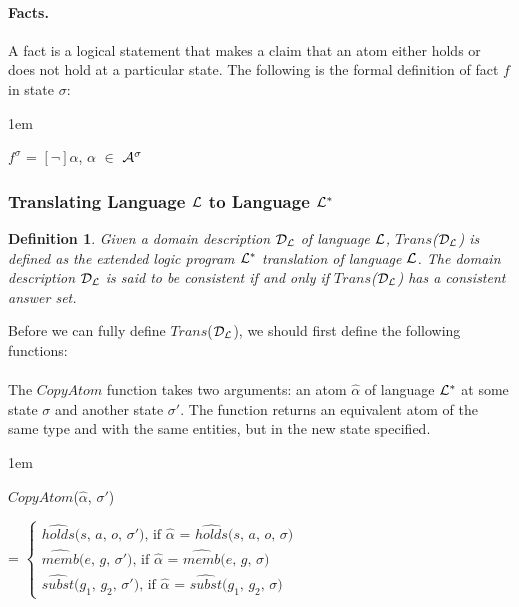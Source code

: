\documentclass[11pt, twocolumn]{article}
\newtheorem{vdefinition}{Definition}
\newenvironment{vquote}
  {\begin{list}{}{\leftmargin 1em}\item[]}
  {\end{list}}
\begin{document}
        \paragraph{Facts.}

          A fact is a logical statement that makes a claim that an atom either
          holds or does not hold at a particular state. The following is the
          formal definition of fact $f$ in state $\sigma$:

          \begin{vquote}
            $f^{\sigma}$ = $[\lnot]$$\alpha$, $\alpha$ $\in$ ${\cal A}^{\sigma}$
          \end{vquote}

      \subsubsection{Translating Language ${\cal L}$ to Language ${\cal L^{*}}$}

        \begin{vdefinition}
          Given a domain description ${\cal D}_{\cal L}$ of language
          ${\cal L}$, $Trans$(${\cal D}_{\cal L}$) is defined as the
          extended logic program ${\cal L}^{*}$ translation of language
          ${\cal L}$. The domain description ${\cal D}_{\cal L}$ is said to be
          {\em consistent} if and only if $Trans$(${\cal D}_{\cal L}$) has
          a consistent answer set.
        \end{vdefinition}

        Before we can fully define $Trans$(${\cal D}_{\cal L}$), we should
        first define the following functions:

        \paragraph{}

          The $CopyAtom$ function takes two arguments: an atom $\hat{\alpha}$
          of language ${\cal L}^{*}$ at some state $\sigma$ and another state
          $\sigma'$. The function returns an equivalent atom of the same type
          and with the same entities, but in the new state specified.

          \begin{vquote}
            $CopyAtom$($\hat{\alpha}$, $\sigma'$)

            =
            \begin{math}
              \begin{cases}
                \mbox{$\hat{holds}$($s$, $a$, $o$, $\sigma'$), if $\hat{\alpha}$ = $\hat{holds}$($s$, $a$, $o$, $\sigma$)} \\
                \mbox{$\hat{memb}$($e$, $g$, $\sigma'$), if $\hat{\alpha}$ = $\hat{memb}$($e$, $g$, $\sigma$)} \\
                \mbox{$\hat{subst}$($g_{1}$, $g_{2}$, $\sigma'$), if $\hat{\alpha}$ = $\hat{subst}$($g_{1}$, $g_{2}$, $\sigma$)}
              \end{cases}
            \end{math}
          \end{vquote}
\end{document}
